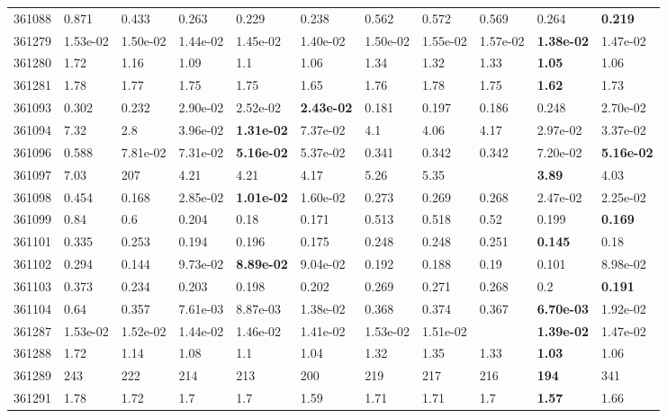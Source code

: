\begin{table}[ht!]
\begin{tabular}{lllllllllll}
  361088 & 0.871 & 0.433 & 0.263 & 0.229 & 0.238 & 0.562 & 0.572 & 0.569 & 0.264 & \textbf{0.219} \\ 
  361279 & 1.53e-02 & 1.50e-02 & 1.44e-02 & 1.45e-02 & 1.40e-02 & 1.50e-02 & 1.55e-02 & 1.57e-02 & \textbf{1.38e-02} & 1.47e-02 \\ 
  361280 & 1.72 & 1.16 & 1.09 & 1.1 & 1.06 & 1.34 & 1.32 & 1.33 & \textbf{1.05} & 1.06 \\ 
  361281 & 1.78 & 1.77 & 1.75 & 1.75 & 1.65 & 1.76 & 1.78 & 1.75 & \textbf{1.62} & 1.73 \\ 
  361093 & 0.302 & 0.232 & 2.90e-02 & 2.52e-02 & \textbf{2.43e-02} & 0.181 & 0.197 & 0.186 & 0.248 & 2.70e-02 \\ 
  361094 & 7.32 & 2.8 & 3.96e-02 & \textbf{1.31e-02} & 7.37e-02 & 4.1 & 4.06 & 4.17 & 2.97e-02 & 3.37e-02 \\ 
  361096 & 0.588 & 7.81e-02 & 7.31e-02 & \textbf{5.16e-02} & 5.37e-02 & 0.341 & 0.342 & 0.342 & 7.20e-02 & \textbf{5.16e-02} \\ 
  361097 & 7.03 & 207 & 4.21 & 4.21 & 4.17 & 5.26 & 5.35 &  & \textbf{3.89} & 4.03 \\ 
  361098 & 0.454 & 0.168 & 2.85e-02 & \textbf{1.01e-02} & 1.60e-02 & 0.273 & 0.269 & 0.268 & 2.47e-02 & 2.25e-02 \\ 
  361099 & 0.84 & 0.6 & 0.204 & 0.18 & 0.171 & 0.513 & 0.518 & 0.52 & 0.199 & \textbf{0.169} \\ 
  361101 & 0.335 & 0.253 & 0.194 & 0.196 & 0.175 & 0.248 & 0.248 & 0.251 & \textbf{0.145} & 0.18 \\ 
  361102 & 0.294 & 0.144 & 9.73e-02 & \textbf{8.89e-02} & 9.04e-02 & 0.192 & 0.188 & 0.19 & 0.101 & 8.98e-02 \\ 
  361103 & 0.373 & 0.234 & 0.203 & 0.198 & 0.202 & 0.269 & 0.271 & 0.268 & 0.2 & \textbf{0.191} \\ 
  361104 & 0.64 & 0.357 & 7.61e-03 & 8.87e-03 & 1.38e-02 & 0.368 & 0.374 & 0.367 & \textbf{6.70e-03} & 1.92e-02 \\ 
  361287 & 1.53e-02 & 1.52e-02 & 1.44e-02 & 1.46e-02 & 1.41e-02 & 1.53e-02 & 1.51e-02 &  & \textbf{1.39e-02} & 1.47e-02 \\ 
  361288 & 1.72 & 1.14 & 1.08 & 1.1 & 1.04 & 1.32 & 1.35 & 1.33 & \textbf{1.03} & 1.06 \\ 
  361289 & 243 & 222 & 214 & 213 & 200 & 219 & 217 & 216 & \textbf{194} & 341 \\ 
  361291 & 1.78 & 1.72 & 1.7 & 1.7 & 1.59 & 1.71 & 1.71 & 1.7 & \textbf{1.57} & 1.66 \\ 

\end{tabular}
\end{table}
